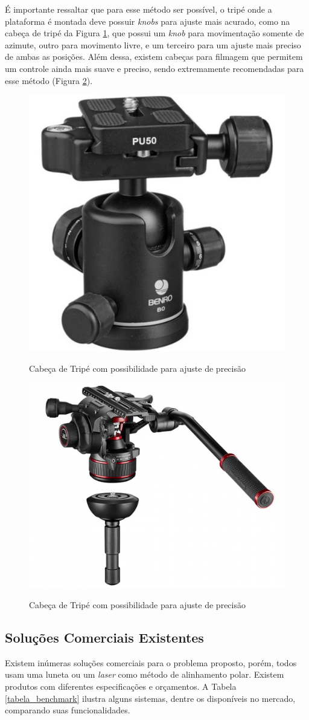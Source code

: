 É importante ressaltar que para esse método ser possível, o tripé onde a plataforma é montada deve possuir \textit{knobs} para ajuste mais acurado, como na cabeça de tripé da Figura \ref{fig:ballhead}, que possui um \textit{knob} para movimentação somente de azimute, outro para movimento livre, e um terceiro para um ajuste mais preciso de ambas as posições. Além dessa, existem cabeças para filmagem que permitem um controle ainda mais suave e preciso, sendo extremamente recomendadas para esse método (Figura \ref{fig:ballheadfilmagem}).

\begin{figure}[!htb]
	\centering
	\caption{Cabeça de Tripé com possibilidade para ajuste de precisão}
	\includegraphics[width=0.3\linewidth]{figuras/ballhead}
	\label{fig:ballhead}
\end{figure}

\begin{figure}[!htb]
	\centering
	\caption{Cabeça de Tripé com possibilidade para ajuste de precisão}
	\includegraphics[width=0.4\linewidth]{figuras/video-head}
	\label{fig:ballheadfilmagem}
\end{figure}

\subsection{Soluções Comerciais Existentes}

Existem inúmeras soluções comerciais para o problema proposto, porém, todos usam uma luneta ou um \textit{laser} como método de alinhamento polar. Existem produtos com diferentes especificações e orçamentos. A Tabela \ref{tabela_benchmark} ilustra alguns sistemas, dentre os disponíveis no mercado, comparando suas funcionalidades. 


